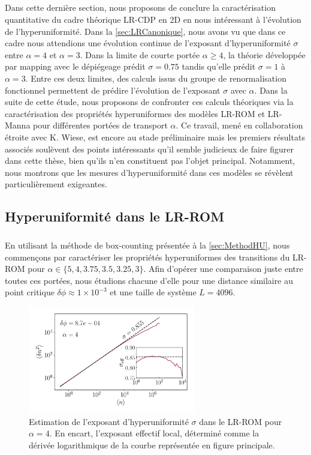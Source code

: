 \subparagraph{}Dans cette dernière section, nous proposons de conclure la caractérisation quantitative du cadre théorique LR-CDP en 2D en nous intéressant à l'évolution de l'hyperuniformité. Dans la \autoref{sec:LRCanonique}, nous avons vu que dans ce cadre nous attendions une évolution continue de l'exposant d'hyperuniformité $\sigma$ entre $\alpha = 4$ et $\alpha=3$. Dans la limite de courte portée $\alpha \geq 4$, la théorie développée par mapping avec le dépiégeage \cite{wiese_hyperuniformity_2024} prédit $\sigma = 0.75$ tandis qu'elle prédit $\sigma = 1$ à $\alpha = 3$. Entre ces deux limites, des calculs issus du groupe de renormalisation fonctionnel permettent de prédire l'évolution de l'exposant $\sigma$ avec $\alpha$. Dans la suite de cette étude, nous proposons de confronter ces calculs théoriques via la caractérisation des propriétés hyperuniformes des modèles LR-ROM et LR-Manna pour différentes portées de transport $\alpha$. Ce travail, mené en collaboration étroite avec K. Wiese, est encore au stade préliminaire mais les premiers résultats associés soulèvent des points intéressants qu'il semble judicieux de faire figurer dans cette thèse, bien qu'ils n'en constituent pas l'objet principal. Notamment, nous montrons que les mesures d'hyperuniformité dans ces modèles se révèlent particulièrement exigeantes.

\label{sec:HUjumps}

\subsection{Hyperuniformité dans le LR-ROM}

\subparagraph{}En utilisant la méthode de box-counting présentée à la \autoref{sec:MethodHU}, nous commençons par caractériser les propriétés hyperuniformes des transitions du LR-ROM pour $\alpha\in\{ 5, 4, 3.75, 3.5, 3.25, 3 \}$. Afin d'opérer une comparaison juste entre toutes ces portées, nous étudions chacune d'elle pour une distance similaire au point critique $\delta\phi \approx 1\times 10^{-3}$ et une taille de système $L=4096$.

\begin{figure}[h]
	\centering	\includegraphics[width=0.65\textwidth]{Chapitre2/Figures/Hyperuniformity/FigHULRROM.pdf}
	\caption{Estimation de l'exposant d'hyperuniformité $\sigma$ dans le LR-ROM pour $\alpha=4$. En encart, l'exposant effectif local, déterminé comme la dérivée logarithmique de la courbe représentée en figure principale.}
	\label{fig:ExHUJumps}
\end{figure}

